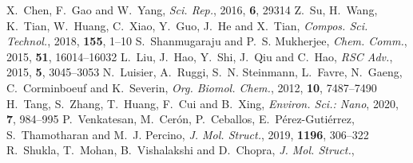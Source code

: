 \documentclass[twoside,twocolumn,9pt]{article}
\begin{document}
\begin{mcitethebibliography}{79}
\EndOfBibitem
{}
X.~Chen, F.~Gao and W.~Yang, \emph{Sci. Rep.}, 2016, \textbf{6}, 29314\relax
\mciteBstWouldAddEndPuncttrue
\mciteSetBstMidEndSepPunct{\mcitedefaultmidpunct}
{\mcitedefaultendpunct}{\mcitedefaultseppunct}\relax
\EndOfBibitem
{}
Z.~Su, H.~Wang, K.~Tian, W.~Huang, C.~Xiao, Y.~Guo, J.~He and X.~Tian,
  \emph{Compos. Sci. Technol.}, 2018, \textbf{155}, 1--10\relax
\mciteBstWouldAddEndPuncttrue
\mciteSetBstMidEndSepPunct{\mcitedefaultmidpunct}
{\mcitedefaultendpunct}{\mcitedefaultseppunct}\relax
\EndOfBibitem
{}
S.~Shanmugaraju and P.~S. Mukherjee, \emph{Chem. Comm.}, 2015, \textbf{51},
  16014--16032\relax
\mciteBstWouldAddEndPuncttrue
\mciteSetBstMidEndSepPunct{\mcitedefaultmidpunct}
{\mcitedefaultendpunct}{\mcitedefaultseppunct}\relax
\EndOfBibitem
{}
L.~Liu, J.~Hao, Y.~Shi, J.~Qiu and C.~Hao, \emph{RSC Adv.}, 2015, \textbf{5},
  3045--3053\relax
\mciteBstWouldAddEndPuncttrue
\mciteSetBstMidEndSepPunct{\mcitedefaultmidpunct}
{\mcitedefaultendpunct}{\mcitedefaultseppunct}\relax
\EndOfBibitem
{}
N.~Luisier, A.~Ruggi, S.~N. Steinmann, L.~Favre, N.~Gaeng, C.~Corminboeuf and
  K.~Severin, \emph{Org. Biomol. Chem.}, 2012, \textbf{10}, 7487--7490\relax
\mciteBstWouldAddEndPuncttrue
\mciteSetBstMidEndSepPunct{\mcitedefaultmidpunct}
{\mcitedefaultendpunct}{\mcitedefaultseppunct}\relax
\EndOfBibitem
{}
H.~Tang, S.~Zhang, T.~Huang, F.~Cui and B.~Xing, \emph{Environ. Sci.: Nano},
  2020, \textbf{7}, 984--995\relax
\mciteBstWouldAddEndPuncttrue
\mciteSetBstMidEndSepPunct{\mcitedefaultmidpunct}
{\mcitedefaultendpunct}{\mcitedefaultseppunct}\relax
\EndOfBibitem
{}
P.~Venkatesan, M.~Cer\'{o}n, P.~Ceballos, E.~P\'{e}rez-Guti\'{e}rrez,
  S.~Thamotharan and M.~J. Percino, \emph{J. Mol. Struct.}, 2019,
  \textbf{1196}, 306--322\relax
\mciteBstWouldAddEndPuncttrue
\mciteSetBstMidEndSepPunct{\mcitedefaultmidpunct}
{\mcitedefaultendpunct}{\mcitedefaultseppunct}\relax
\EndOfBibitem
{}
R.~Shukla, T.~Mohan, B.~Vishalakshi and D.~Chopra, \emph{J. Mol. Struct.},

\end{mcitethebibliography}
\end{document}
